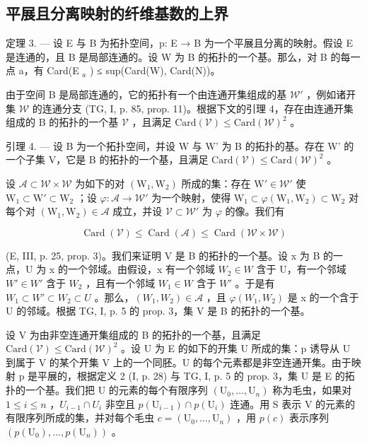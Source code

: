 \subsection{平展且分离映射的纤维基数的上界}

定理 3. --- 设 E 与 B 为拓扑空间，p: E → B 为一个平展且分离的映射。假设 E 是连通的，且 B 是局部连通的。设 W 为 B 的拓扑的一个基。那么，对 B 的每一点 a，有 Card(E \(_{a}\) ) ≤ sup(Card(W), Card(N))。

由于空间 B 是局部连通的，它的拓扑有一个由连通开集组成的基 \(\mathcal{W}'\) ，例如诸开集 \(\mathcal{W}\) 的连通分支 (TG, I, p. 85, prop. 11)。根据下文的引理 4，存在由连通开集组成的 B 的拓扑的一个基 \(\mathcal{V}\) ，且满足 \(\mathrm{Card}(\mathcal{V}) \leqslant \mathrm{Card}(\mathcal{W})^2\) 。

引理 4. --- 设 B 为一个拓扑空间，并设 W 与 W' 为 B 的拓扑的基。存在 W' 的一个子集 V，它是 B 的拓扑的一个基，且满足 \(\text{Card}(\mathcal{V}) \leqslant \text{Card}(\mathcal{W})^{2}\) 。

设 \(\mathcal{A} \subset \mathcal{W} \times \mathcal{W}\) 为如下的对 \((\mathrm{W}_1, \mathrm{W}_2)\) 所成的集：存在 \(\mathrm{W}' \in \mathcal{W}'\) 使 \(\mathrm{W}_1 \subset \mathrm{W}' \subset \mathrm{W}_2\) ；设 \(\varphi: \mathcal{A} \to \mathcal{W}'\) 为一个映射，使得 \(\mathrm{W}_1 \subset \varphi(\mathrm{W}_1, \mathrm{W}_2) \subset \mathrm{W}_2\) 对每个对 \((\mathrm{W}_1, \mathrm{W}_2) \in \mathcal{A}\) 成立，并设 \(\mathcal{V} \subset \mathcal{W}'\) 为 \(\varphi\) 的像。我们有

\[
\operatorname{Card} (\mathcal {V}) \leqslant \operatorname{Card} (\mathcal {A}) \leqslant \operatorname{Card} (\mathcal {W} \times \mathcal {W})
\]

(E, III, p. 25, prop. 3)。我们来证明 V 是 B 的拓扑的一个基。设 x 为 B 的一点，U 为 x 的一个邻域。由假设，x 有一个邻域 \(W_{2} \in W\) 含于 U，有一个邻域 \(W' \in W'\) 含于 \(W_{2}\) ，且有一个邻域 \(W_{1} \in W\) 含于 \(W'\) 。于是有 \(W_{1} \subset W' \subset W_{2} \subset U\) 。那么，\((W_{1}, W_{2}) \in \mathscr{A}\) ，且 \(\varphi(W_{1}, W_{2})\) 是 x 的一个含于 U 的邻域。根据 TG, I, p. 5 的 prop. 3，集 V 是 B 的拓扑的一个基。

设 V 为由非空连通开集组成的 B 的拓扑的一个基，且满足 \(\text{Card}(\mathcal{V}) \leqslant \text{Card}(\mathcal{W})^{2}\) 。设 U 为 E 的如下的开集 U 所成的集：p 诱导从 U 到属于 V 的某个开集 V 上的一个同胚。U 的每个元素都是非空连通开集。由于映射 p 是平展的，根据定义 2 (I, p. 28) 与 TG, I, p. 5 的 prop. 3，集 U 是 E 的拓扑的一个基。我们把 U 的元素的每个有限序列 \((\mathrm{U}_{0}, \ldots, \mathrm{U}_{n})\) 称为毛虫，如果对 \(1 \leqslant i \leqslant n\) ，\(U_{i-1} \cap U_{i}\) 非空且 \(p(\mathrm{U}_{i-1}) \cap p(\mathrm{U}_{i})\) 连通。用 S 表示 V 的元素的有限序列所成的集，并对每个毛虫 \(c = (\mathrm{U}_{0}, \ldots, \mathrm{U}_{n})\) ，用 \(p(c)\) 表示序列 \((p(\mathrm{U}_{0}), \ldots, p(\mathrm{U}_{n}))\) 。

